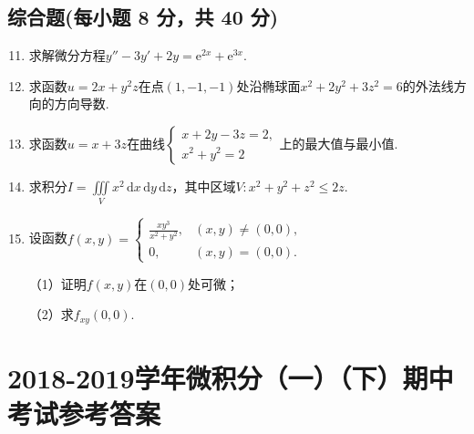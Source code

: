 \documentclass[../main.tex]{subfiles}
\begin{document}
\section{综合题(每小题 8 分，共 40 分)}
\begin{enumerate}
    \setcounter{enumi}{10}

    \item 求解微分方程$y''-3y'+2y = \mathrm{e}^{2x}+\mathrm{e}^{3x}$.
          \vspace{12em}

    \item 求函数$u=2x+y^{2} z$在点$(1,-1,-1)$处沿椭球面$x^{2}+2y^{2}+3z^{2}=6$的外法线方向的方向导数.
          \vspace{11em}

    \item 求函数$u=x+3z$在曲线$\begin{cases}
                  x+2y-3z=2, \\
                  x^{2}+y^{2} = 2
              \end{cases}$上的最大值与最小值.
          \vspace{11em}

    \item 求积分$I=\iiint\limits_{V}x^{2}\,\mathrm{d}x\,\mathrm{d}y\,\mathrm{d}z$，其中区域$V
              :x^{2}+y^{2}+z^{2}\leq 2z$.
          \vspace{11em}

    \item 设函数$f(x,y)=
              \begin{cases}
                  \frac{xy^{3}}{x^{2}+y^{2}}, & (x,y)\neq (0,0), \\
                  0,                          & (x,y)=(0,0).
              \end{cases}$

          （1）证明$f(x,y)$在$(0,0)$处可微；

          （2）求$f_{xy}(0,0)$.
          \vspace{11em}
\end{enumerate}

\chapter{2018-2019学年微积分（一）（下）期中考试参考答案}
\end{document}
